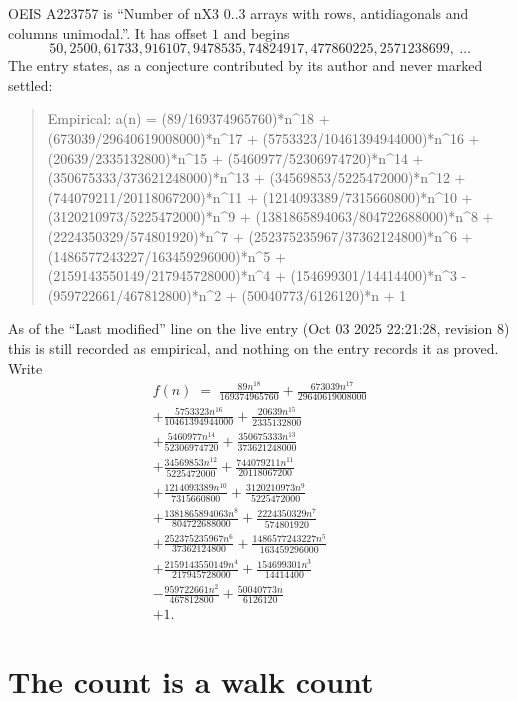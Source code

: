 \documentclass[11pt,a4paper]{article}
\theoremstyle{plain}
\theoremstyle{definition}
\begin{document}
OEIS A223757 is ``Number of nX3 0..3 arrays with rows, antidiagonals and columns unimodal.''. It has offset $1$ and begins
\[
50, 2500, 61733, 916107, 9478535, 74824917, 477860225, 2571238699,\ \dots
\]
The entry states, as a conjecture contributed by its author and never marked settled:
\begin{quote}\raggedright\small
Empirical: a(n) = (89/169374965760)*n\^{}18 + (673039/29640619008000)*n\^{}17 + (5753323/10461394944000)*n\^{}16 + (20639/2335132800)*n\^{}15 + (5460977/52306974720)*n\^{}14 + (350675333/373621248000)*n\^{}13 + (34569853/5225472000)*n\^{}12 + (744079211/20118067200)*n\^{}11 + (1214093389/7315660800)*n\^{}10 + (3120210973/5225472000)*n\^{}9 + (1381865894063/804722688000)*n\^{}8 + (2224350329/574801920)*n\^{}7 + (252375235967/37362124800)*n\^{}6 + (1486577243227/163459296000)*n\^{}5 + (2159143550149/217945728000)*n\^{}4 + (154699301/14414400)*n\^{}3 - (959722661/467812800)*n\^{}2 + (50040773/6126120)*n + 1
\end{quote}
As of the ``Last modified'' line on the live entry (Oct 03 2025 22:21:28, revision 8) this is still
recorded as empirical, and nothing on the entry records it as proved. Write
\begin{multline*}
f(n)\;=\;\frac{89 n^{18}}{169374965760} + \frac{673039 n^{17}}{29640619008000} \\
+ \frac{5753323 n^{16}}{10461394944000} + \frac{20639 n^{15}}{2335132800} \\
+ \frac{5460977 n^{14}}{52306974720} + \frac{350675333 n^{13}}{373621248000} \\
+ \frac{34569853 n^{12}}{5225472000} + \frac{744079211 n^{11}}{20118067200} \\
+ \frac{1214093389 n^{10}}{7315660800} + \frac{3120210973 n^{9}}{5225472000} \\
+ \frac{1381865894063 n^{8}}{804722688000} + \frac{2224350329 n^{7}}{574801920} \\
+ \frac{252375235967 n^{6}}{37362124800} + \frac{1486577243227 n^{5}}{163459296000} \\
+ \frac{2159143550149 n^{4}}{217945728000} + \frac{154699301 n^{3}}{14414400} \\
- \frac{959722661 n^{2}}{467812800} + \frac{50040773 n}{6126120} \\
+ 1.
\end{multline*}

\section{The count is a walk count}
\end{document}
